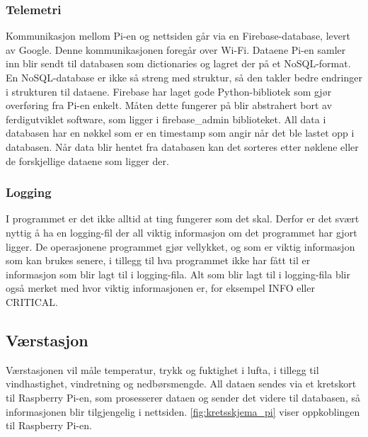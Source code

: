 \subsubsection{Telemetri}
\label{subsubsec:telemetri}

Kommunikasjon mellom Pi-en og nettsiden går via en Firebase-database, levert av Google. Denne kommunikasjonen foregår over Wi-Fi. Dataene Pi-en samler inn blir sendt til databasen som dictionaries og lagret der på et NoSQL-format. En NoSQL-database er ikke så streng med struktur, så den takler bedre endringer i strukturen til dataene. Firebase har laget gode Python-bibliotek som gjør overføring fra Pi-en enkelt. Måten dette fungerer på blir abstrahert bort av ferdigutviklet software, som ligger i firebase\_admin biblioteket. All data i databasen har en nøkkel som er en timestamp som angir når det ble lastet opp i databasen. Når data blir hentet fra databasen kan det sorteres etter nøklene eller de forskjellige dataene som ligger der.

\subsubsection{Logging}
I programmet er det ikke alltid at ting fungerer som det skal. Derfor er det svært nyttig å ha en logging-fil der all viktig informasjon om det programmet har gjort ligger. De operasjonene programmet gjør vellykket, og som er viktig informasjon som kan brukes senere, i tillegg til hva programmet ikke har fått til er informasjon som blir lagt til i logging-fila. Alt som blir lagt til i logging-fila blir også merket med hvor viktig informasjonen er, for eksempel INFO eller CRITICAL. 

\subsection{Værstasjon}

Værstasjonen vil måle temperatur, trykk og fuktighet i lufta, i tillegg til vindhastighet, vindretning og nedbørsmengde. All dataen sendes via et kretskort til Raspberry Pi-en, som prosesserer dataen og sender det videre til databasen, så informasjonen blir tilgjengelig i nettsiden. \autoref{fig:kretsskjema_pi} viser oppkoblingen til Raspberry Pi-en.

